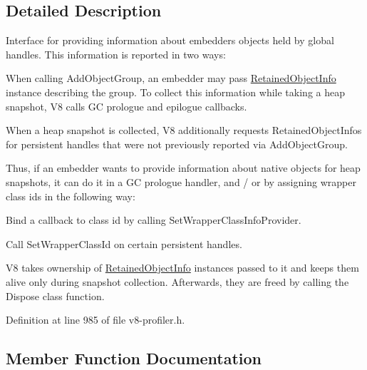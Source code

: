 \subsection{Detailed Description}
Interface for providing information about embedder\textquotesingle{}s objects held by global handles. This information is reported in two ways\+:


\begin{DoxyEnumerate}
\item When calling Add\+Object\+Group, an embedder may pass \mbox{\hyperlink{classv8_1_1RetainedObjectInfo}{Retained\+Object\+Info}} instance describing the group. To collect this information while taking a heap snapshot, V8 calls GC prologue and epilogue callbacks.
\item When a heap snapshot is collected, V8 additionally requests Retained\+Object\+Infos for persistent handles that were not previously reported via Add\+Object\+Group.
\end{DoxyEnumerate}

Thus, if an embedder wants to provide information about native objects for heap snapshots, it can do it in a GC prologue handler, and / or by assigning wrapper class ids in the following way\+:


\begin{DoxyEnumerate}
\item Bind a callback to class id by calling Set\+Wrapper\+Class\+Info\+Provider.
\item Call Set\+Wrapper\+Class\+Id on certain persistent handles.
\end{DoxyEnumerate}

V8 takes ownership of \mbox{\hyperlink{classv8_1_1RetainedObjectInfo}{Retained\+Object\+Info}} instances passed to it and keeps them alive only during snapshot collection. Afterwards, they are freed by calling the Dispose class function. 

Definition at line 985 of file v8-\/profiler.\+h.



\subsection{Member Function Documentation}
\mbox{\label{classv8_1_1RetainedObjectInfo_a5011203f7c5949049ba36b8059f03eca}} 
